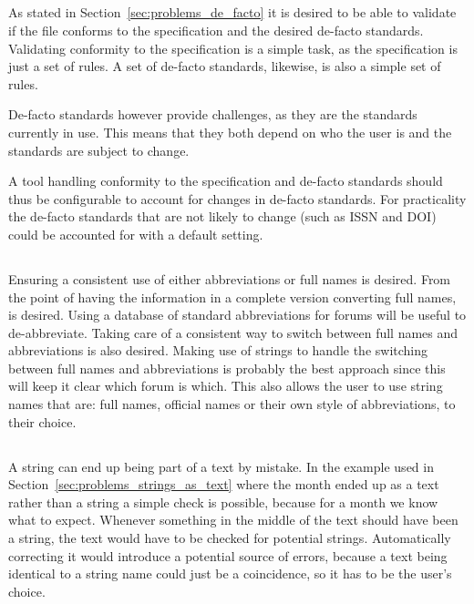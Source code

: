 \subsection{}

As stated in Section~\ref{sec:problems_de_facto} it is desired to be
able to validate if the file conforms to the specification and the
desired de-facto standards.  Validating conformity to the
specification is a simple task, as the specification is just a set of
rules.  A set of de-facto standards, likewise, is also a simple set of
rules.

De-facto standards however provide challenges, as they are the
standards currently in use.  This means that they both depend on who
the user is and the standards are subject to change.

A tool handling conformity to the specification and de-facto standards
should thus be configurable to account for changes in de-facto
standards.  For practicality the de-facto standards that are not
likely to change (such as ISSN and DOI) could be accounted for with a
default setting.


\subsection{}

Ensuring a consistent use of either abbreviations or full names is
desired.  From the point of having the information in a complete
version converting full names,  is desired.
Using a database of standard abbreviations for forums will be useful
to de-abbreviate.  Taking care of a consistent way to switch between
full names and abbreviations is also desired.  Making use of strings
to handle the switching between full names and abbreviations is
probably the best approach since this will keep it clear which forum
is which.  This also allows the user to use string names that are:
full names, official names or their own style of abbreviations, to
their choice.


\subsection{}

A {\bibtex} string can end up being part of a text by mistake.  In the
example used in Section~\ref{sec:problems_strings_as_text} where the
month ended up as a text rather than a string a simple check is
possible, because for a month we know what to expect.  Whenever
something in the middle of the text should have been a string, the
text would have to be checked for potential strings.  Automatically
correcting it would introduce a potential source of errors, because a
text being identical to a string name could just be a coincidence, so
it has to be the user's choice.


